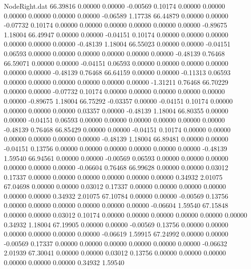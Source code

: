 \begin{filecontents}{NodeRight.dat}
  66.39816    0.00000    0.00000    -0.00569    0.10174    0.00000    0.00000    0.00000    0.00000    0.00000    0.00000   -0.06589    1.17738
  66.44879    0.00000    0.00000    -0.07732    0.10174    0.00000    0.00000    0.00000    0.00000    0.00000    0.00000   -0.89675    1.18004
  66.49947    0.00000    0.00000    -0.04151    0.10174    0.00000    0.00000    0.00000    0.00000    0.00000    0.00000   -0.48139    1.18004
  66.55023    0.00000    0.00000    -0.04151    0.06593    0.00000    0.00000    0.00000    0.00000    0.00000    0.00000   -0.48139    0.76468
  66.59071    0.00000    0.00000    -0.04151    0.06593    0.00000    0.00000    0.00000    0.00000    0.00000    0.00000   -0.48139    0.76468
  66.64159    0.00000    0.00000    -0.11313    0.06593    0.00000    0.00000    0.00000    0.00000    0.00000    0.00000   -1.31211    0.76468
  66.70229    0.00000    0.00000    -0.07732    0.10174    0.00000    0.00000    0.00000    0.00000    0.00000    0.00000   -0.89675    1.18004
  66.75292   -0.03357    0.00000    -0.04151    0.10174    0.00000    0.00000    0.00000    0.00000    0.03357    0.00000   -0.48139    1.18004
  66.80355    0.00000    0.00000    -0.04151    0.06593    0.00000    0.00000    0.00000    0.00000    0.00000    0.00000   -0.48139    0.76468
  66.85429    0.00000    0.00000    -0.04151    0.10174    0.00000    0.00000    0.00000    0.00000    0.00000    0.00000   -0.48139    1.18004
  66.89481    0.00000    0.00000    -0.04151    0.13756    0.00000    0.00000    0.00000    0.00000    0.00000    0.00000   -0.48139    1.59540
  66.94561    0.00000    0.00000    -0.00569    0.06593    0.00000    0.00000    0.00000    0.00000    0.00000    0.00000   -0.06604    0.76468
  66.99628    0.00000    0.00000     0.03012    0.17337    0.00000    0.00000    0.00000    0.00000    0.00000    0.00000    0.34932    2.01075
  67.04698    0.00000    0.00000     0.03012    0.17337    0.00000    0.00000    0.00000    0.00000    0.00000    0.00000    0.34932    2.01075
  67.10784    0.00000    0.00000    -0.00569    0.13756    0.00000    0.00000    0.00000    0.00000    0.00000    0.00000   -0.06604    1.59540
  67.15848    0.00000    0.00000     0.03012    0.10174    0.00000    0.00000    0.00000    0.00000    0.00000    0.00000    0.34932    1.18004
  67.19905    0.00000    0.00000    -0.00569    0.13756    0.00000    0.00000    0.00000    0.00000    0.00000    0.00000   -0.06619    1.59915
  67.24992    0.00000    0.00000    -0.00569    0.17337    0.00000    0.00000    0.00000    0.00000    0.00000    0.00000   -0.06632    2.01939
  67.30041    0.00000    0.00000     0.03012    0.13756    0.00000    0.00000    0.00000    0.00000    0.00000    0.00000    0.34932    1.59540

\end{filecontents}
